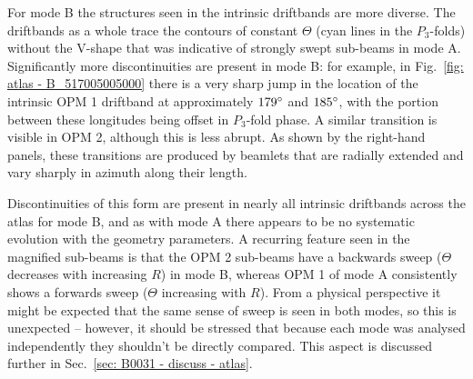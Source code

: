 For mode B the structures seen in the intrinsic driftbands are more diverse. The driftbands as a whole trace the contours of constant $\Theta$ (cyan lines in the $P_3$-folds) without the V-shape that was indicative of strongly swept sub-beams in mode A. Significantly more discontinuities are present in mode B: for example, in Fig.~\ref{fig: atlas - B_517005005000} there is a very sharp jump in the location of the intrinsic OPM 1 driftband at approximately $179^\circ$ and $185^\circ$, with the portion between these longitudes being offset in $P_3$-fold phase. A similar transition is visible in OPM 2, although this is less abrupt. As shown by the right-hand panels, these transitions are produced by beamlets that are radially extended and vary sharply in azimuth along their length.

Discontinuities of this form are present in nearly all intrinsic driftbands across the atlas for mode B, and as with mode A there appears to be no systematic evolution with the geometry parameters. A recurring feature seen in the magnified sub-beams is that the OPM 2 sub-beams have a backwards sweep ($\Theta$ decreases with increasing $R$) in mode B, whereas OPM 1 of mode A consistently shows a forwards sweep  ($\Theta$ increasing with $R$). From a physical perspective it might be expected that the same sense of sweep is seen in both modes, so this is unexpected -- however, it should be stressed that because each mode was analysed independently they shouldn't be directly compared. This aspect is discussed further in Sec.~\ref{sec: B0031 - discuss - atlas}.

